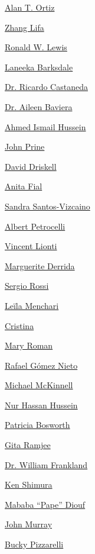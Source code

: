 \protect\hyperlink{alan-t-ortiz}{Alan T. Ortiz}

\protect\hyperlink{zhang-lifa}{Zhang Lifa}

\protect\hyperlink{ronald-w-lewis}{Ronald W. Lewis}

\protect\hyperlink{laneeka-barksdale}{Laneeka Barksdale}

\protect\hyperlink{dr-ricardo-castaneda}{Dr. Ricardo Castaneda}

\protect\hyperlink{dr-aileen-baviera}{Dr. Aileen Baviera}

\protect\hyperlink{ahmed-ismail-hussein}{Ahmed Ismail Hussein}

\protect\hyperlink{john-prine}{John Prine}

\protect\hyperlink{david-driskell}{David Driskell}

\protect\hyperlink{anita-fial}{Anita Fial}

\protect\hyperlink{sandra-santosvizcaino}{Sandra Santos-Vizcaino}

\protect\hyperlink{albert-petrocelli}{Albert Petrocelli}

\protect\hyperlink{vincent-lionti}{Vincent Lionti}

\protect\hyperlink{marguerite-derrida}{Marguerite Derrida}

\protect\hyperlink{sergio-rossi}{Sergio Rossi}

\protect\hyperlink{leuxefla-menchari}{Leïla Menchari}

\protect\hyperlink{cristina}{Cristina}

\protect\hyperlink{mary-roman}{Mary Roman}

\protect\hyperlink{rafael-guxf3mez-nieto}{Rafael Gómez Nieto}

\protect\hyperlink{michael-mckinnell}{Michael McKinnell}

\protect\hyperlink{nur-hassan-hussein}{Nur Hassan Hussein}

\protect\hyperlink{patricia-bosworth}{Patricia Bosworth}

\protect\hyperlink{gita-ramjee}{Gita Ramjee}

\protect\hyperlink{dr-william-frankland}{Dr. William Frankland}

\protect\hyperlink{ken-shimura}{Ken Shimura}

\protect\hyperlink{mababa-ux201cpapeux201d-diouf}{Mababa ``Pape'' Diouf}

\protect\hyperlink{john-murray}{John Murray}

\protect\hyperlink{bucky-pizzarelli}{Bucky Pizzarelli}

